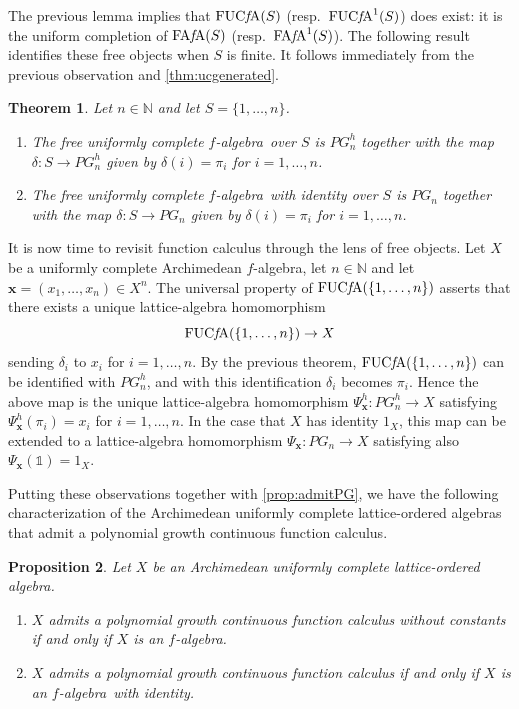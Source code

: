 \documentclass{amsart}
\theoremstyle{plain}
\newtheorem{thm}{Theorem}[section]
\newtheorem{prop}[thm]{Proposition}
\theoremstyle{definition}
\theoremstyle{remark}
\newcommand\N{\ensuremath{\mathbb{N}}}
\newcommand{\one}{\mathbb{1}}
\newcommand{\falg}{$f\!$-algebra}
\newcommand{\FAFA}[1]{\operatorname{FA{\it f}\!A}(#1)}
\newcommand{\uFAFA}[1]{\operatorname{FA{\it f}\!A}^1(#1)}
\newcommand{\FUCFA}[1]{\operatorname{FUC{\it f}\!A}(#1)}
\newcommand{\uFUCFA}[1]{\operatorname{FUC{\it f}\!A}^1(#1)}
\newcommand{\Psx}{\Psi_{\bm x}}
\begin{document}
The previous lemma implies that $\FUCFA S$ (resp.\ $\uFUCFA S$) does
exist: it is the uniform completion of $\FAFA S$ (resp.\ $\uFAFA S$).
The following result identifies these free objects when $S$ is finite.
It follows immediately from the previous observation and
\cref{thm:ucgenerated}.

\begin{thm}\label{thm:fucfa}
    Let $n \in \N$ and let $S=\{1,\ldots ,n\}$.
    \begin{enumerate}
        \item The free uniformly complete \falg\ over
            $S$ is $PG_n^{h}$ together with the map $\delta \colon S\to
            PG_n^{h}$ given by $\delta (i)=\pi _i$ for $i=1,\ldots ,n$.
        \item The free uniformly complete \falg\ with identity over
            $S$ is $PG_n$ together with the map $\delta \colon S\to
            PG_n$ given by $\delta (i)=\pi _i$ for $i=1,\ldots ,n$.
    \end{enumerate}
\end{thm}

It is now time to revisit function calculus through the lens of
free objects. Let $X$ be a uniformly complete Archimedean \falg, let
$n \in \N$ and let $\bm x = (x_1,\ldots ,x_n) \in X^{n}$. The
universal property of $\FUCFA{\{1,\ldots ,n\}}$ asserts that there
exists a unique lattice-algebra homomorphism
\[
\FUCFA{\{1,\ldots ,n\}}\to X
\]
sending $\delta _i$ to $x_i$ for $i=1,\ldots ,n$. By the previous
theorem, $\FUCFA{\{1,\ldots ,n\}}$ can be identified with
$PG_n^{h}$, and with this identification $\delta _i$ becomes $\pi _i$.
Hence the above map is the unique lattice-algebra homomorphism
$\Psx^{h}\colon PG_n^{h}\to X$ satisfying $\Psx^{h}(\pi _i)=x_i$ for
$i=1,\ldots ,n$. In the case that $X$ has identity $1_X$, this map can be
extended to a lattice-algebra homomorphism $\Psx\colon PG_n\to X$
satisfying also $\Psx(\one)=1_X$.

Putting these observations together with \cref{prop:admitPG}, we have the
following characterization of the Archimedean uniformly complete
lattice-ordered algebras that admit a polynomial growth
continuous function calculus.

\begin{prop}\label{prop:ucPG}
    Let $X$ be an Archimedean uniformly complete lattice-ordered
    algebra.
    \begin{enumerate}
        \item $X$ admits a polynomial growth continuous function
            calculus without constants if and only if $X$ is an \falg.
        \item $X$ admits a polynomial growth continuous function
            calculus if and only if $X$ is an \falg\ with identity.
    \end{enumerate}
\end{prop}
\end{document}
